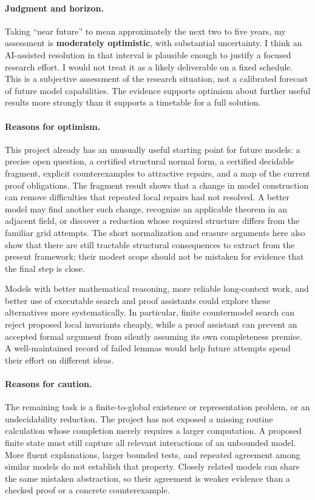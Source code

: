 \documentclass[11pt,letterpaper]{article}
\theoremstyle{definition}
\theoremstyle{remark}
\begin{document}
\paragraph{Judgment and horizon.}
Taking ``near future'' to mean approximately the next two to five years,
my assessment is \textbf{moderately optimistic}, with substantial
uncertainty. I think an AI-assisted resolution in that interval is
plausible enough to justify a focused research effort. I would not treat
it as a likely deliverable on a fixed schedule. This is a subjective
assessment of the research situation, not a calibrated forecast of future
model capabilities. The evidence supports optimism about further useful
results more strongly than it supports a timetable for a full solution.

\paragraph{Reasons for optimism.}
This project already has an unusually useful starting point for future
models: a precise open question, a certified structural normal form, a
certified decidable fragment, explicit counterexamples to attractive
repairs, and a map of the current proof obligations. The fragment result
shows that a change in model construction can remove difficulties that
repeated local repairs had not resolved. A better model may find another
such change, recognize an applicable theorem in an adjacent field, or
discover a reduction whose required structure differs from the familiar
grid attempts. The short normalization and erasure arguments here also
show that there are still tractable structural consequences to extract
from the present framework; their modest scope should not be mistaken
for evidence that the final step is close.

Models with better mathematical reasoning, more reliable long-context
work, and better use of executable search and proof assistants could
explore these alternatives more systematically. In particular, finite
countermodel search can reject proposed local invariants cheaply, while
a proof assistant can prevent an accepted formal argument from silently
assuming its own completeness premise. A well-maintained record of failed
lemmas would help future attempts spend their effort on different ideas.

\paragraph{Reasons for caution.}
The remaining task is a finite-to-global existence or representation
problem, or an undecidability reduction. The project has not exposed a
missing routine calculation whose completion merely requires a larger
computation. A proposed finite state must still capture all relevant
interactions of an unbounded model. More fluent explanations, larger
bounded tests, and repeated agreement among similar models do not
establish that property. Closely related models can share the same
mistaken abstraction, so their agreement is weaker evidence than a
checked proof or a concrete counterexample.
\end{document}
